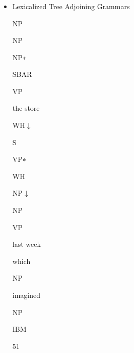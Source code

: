 \documentclass[compress,color=usenames]{beamer}
\begin{document}
\begin{frame}
\frametitle{}

\begin{itemize}
\item

Lexicalized Tree Adjoining Grammars


NP


NP


NP∗





SBAR


VP





the store


WH$\downarrow$





S


VP∗





WH





NP$\downarrow$





NP





VP


last week





which





NP





imagined





NP





IBM





51




\end{itemize}

\end{frame}
\end{document}
